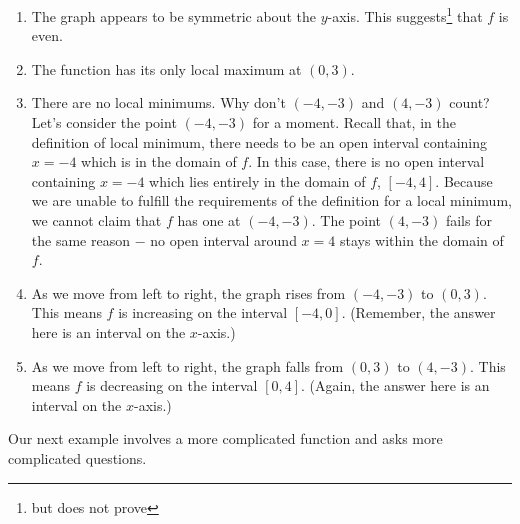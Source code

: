 \documentclass{ximera}
\begin{document}
\begin{example}
\begin{explanation}
\begin{enumerate}
\item  The graph appears to be symmetric about the $y$-axis.  This suggests\footnote{but does not prove} that $f$ is even.

\item  The function has its only local maximum at $(0,3)$.

\item  There are no local minimums.  Why don't $(-4, -3)$ and $(4, -3)$ count?  Let's consider the point $(-4, -3)$ for a moment.  Recall that, in the definition of local minimum, there needs to be an open interval containing  $x = -4$ which is in the domain of $f$.  In this case, there is no open interval containing $x=-4$ which lies entirely in the domain of $f$, $[-4,4]$.  Because we are unable to fulfill the requirements of the definition for a local minimum, we cannot claim that $f$ has one at $(-4, -3)$.  The point $(4, -3)$ fails for the same reason $-$ no open interval around $x = 4$ stays within the domain of $f$.

\item  As we move from left to right, the graph rises from $(-4,-3)$ to $(0,3)$.  This means $f$ is increasing on the interval $[-4,0]$.  (Remember, the answer here is an interval on the $x$-axis.)

\item  As we move from left to right, the graph falls from $(0,3)$ to $(4,-3)$.  This means $f$ is decreasing on the interval $[0,4]$.  (Again, the answer here is an interval on the $x$-axis.) 

\end{enumerate}

\end{explanation}

\end{example} 

Our next example involves a more complicated function and asks more complicated questions.
\end{document}
